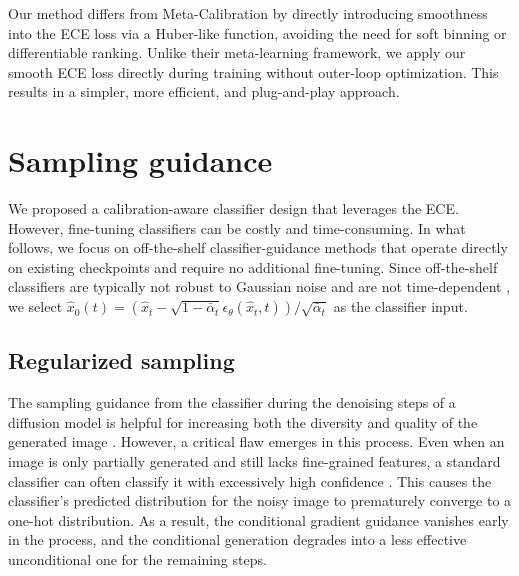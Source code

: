\documentclass{article}
\begin{document}
\begin{remark}
    Our method differs from Meta-Calibration \cite{bohdal2023metacalibration} by directly introducing smoothness into the ECE loss via a Huber-like function, avoiding the need for soft binning or differentiable ranking. Unlike their meta-learning framework, we apply our smooth ECE loss directly during training without outer-loop optimization. This results in a simpler, more efficient, and plug-and-play approach.
\end{remark}






\section{Sampling guidance}
We proposed a calibration-aware classifier design that leverages the ECE. However, fine-tuning classifiers can be costly and time-consuming. In what follows, we focus on off-the-shelf classifier-guidance methods that operate directly on existing checkpoints and require no additional fine-tuning. Since off-the-shelf classifiers are typically not robust to Gaussian noise and are not time-dependent \cite{ma2023elucidating}, we select $\widehat{x}_0(t)=\left(\widehat{x}_t-\sqrt{1-\bar{\alpha}_t} \epsilon_\theta\left(\widehat{x}_t, t\right)\right) / \sqrt{\bar{\alpha}_t}$ as the classifier input. 


\subsection{Regularized sampling} \label{rsample}
The sampling guidance from the classifier during the denoising steps of a diffusion model is helpful for increasing both the diversity and quality of the generated image \cite{dhariwal2021diffusion}. However, a critical flaw emerges in this process. Even when an image is only partially generated and still lacks fine-grained features, a standard classifier can often classify it with excessively high confidence \cite{zheng2022entropy}. This causes the classifier's predicted distribution for the noisy image to prematurely converge to a one-hot distribution. As a result, the conditional gradient guidance vanishes early in the process, and the conditional generation degrades into a less effective unconditional one for the remaining steps.
\end{document}

